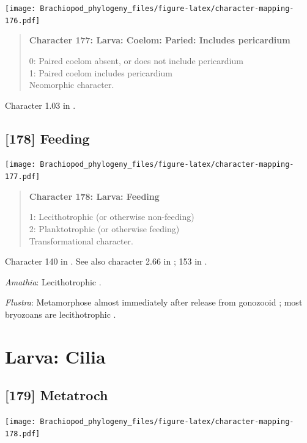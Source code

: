 \documentclass[openany]{book}
\begin{document}
\texttt{[image: Brachiopod\_phylogeny\_files/figure-latex/character-mapping-176.pdf]}

\begin{quote}
\textbf{Character 177: Larva: Coelom: Paried: Includes pericardium}

0: Paired coelom absent, or does not include pericardium\\
1: Paired coelom includes pericardium\\
Neomorphic character.
\end{quote}

Character 1.03 in \citet{Scheltema1993}.

\subsection*{{[}178{]} Feeding}\label{feeding}

\texttt{[image: Brachiopod\_phylogeny\_files/figure-latex/character-mapping-177.pdf]}

\begin{quote}
\textbf{Character 178: Larva: Feeding}

1: Lecithotrophic (or otherwise non-feeding)\\
2: Planktotrophic (or otherwise feeding)\\
Transformational character.
\end{quote}

Character 140 in \citet{Rouse1999}. See also character 2.66 in
\citet{SPS1996}; 153 in \citet{Giribet2002}.

\hypertarget{Amathia-coding-178}{}
\emph{Amathia}: Lecithotrophic \citep{Reed1982}.

\hypertarget{Flustra-coding-178}{}
\emph{Flustra}: Metamorphose almost immediately after release from
gonozooid \citep{Zimmer2013}; most bryozoans are lecithotrophic
\citep{Reed1982}.

\section{Larva: Cilia}\label{larva-cilia}

\subsection*{{[}179{]} Metatroch}\label{metatroch}

\texttt{[image: Brachiopod\_phylogeny\_files/figure-latex/character-mapping-178.pdf]}
\end{document}

